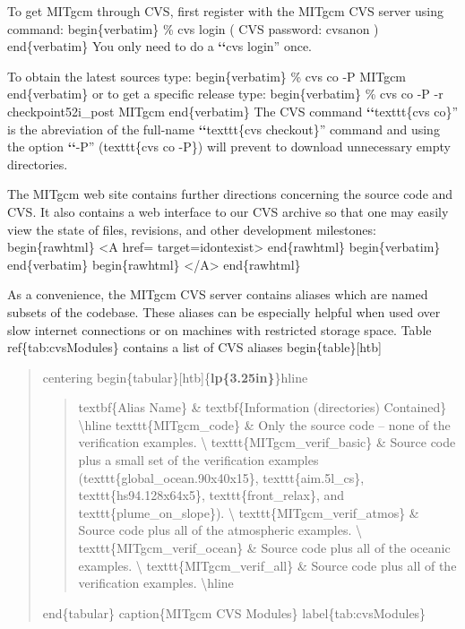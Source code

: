 \documentclass[letterpaper,10pt,english]{sphinxmanual}
\begin{document}
To get MITgcm through CVS, first register with the MITgcm CVS server
using command:
begin\{verbatim\}
\% cvs login ( CVS password: cvsanon )
end\{verbatim\}
You only need to do a {\color{red}\bfseries{}{}`{}`}cvs login'' once.

To obtain the latest sources type:
begin\{verbatim\}
\% cvs co -P MITgcm
end\{verbatim\}
or to get a specific release type:
begin\{verbatim\}
\% cvs co -P -r checkpoint52i\_post MITgcm
end\{verbatim\}
The CVS command {\color{red}\bfseries{}{}`{}`}texttt\{cvs co\}'' is the abreviation of the full-name
{\color{red}\bfseries{}{}`{}`}texttt\{cvs checkout\}'' command and using the option {\color{red}\bfseries{}{}`{}`}-P'' (texttt\{cvs co -P\})
will prevent to download unnecessary empty directories.

The MITgcm web site contains further directions concerning the source
code and CVS.  It also contains a web interface to our CVS archive so
that one may easily view the state of files, revisions, and other
development milestones:
begin\{rawhtml\} \textless{}A href=\sphinxquotedblright{}\sphinxquotedblright{} target=\sphinxquotedblright{}idontexist\sphinxquotedblright{}\textgreater{} end\{rawhtml\}
begin\{verbatim\}
end\{verbatim\}
begin\{rawhtml\} \textless{}/A\textgreater{} end\{rawhtml\}

As a convenience, the MITgcm CVS server contains aliases which are
named subsets of the codebase.  These aliases can be especially
helpful when used over slow internet connections or on machines with
restricted storage space.  Table ref\{tab:cvsModules\} contains a list
of CVS aliases
begin\{table\}{[}htb{]}
\begin{quote}

centering
begin\{tabular\}{[}htb{]}\{{\color{red}\bfseries{}\textbar{}lp\{3.25in\}\textbar{}}\}hline
\begin{quote}

textbf\{Alias Name\}    \&  textbf\{Information (directories) Contained\}  \textbackslash{}hline
texttt\{MITgcm\_code\}  \&  Only the source code -- none of the verification examples.  \textbackslash{}
texttt\{MITgcm\_verif\_basic\}
\&  Source code plus a small set of the verification examples
(texttt\{global\_ocean.90x40x15\}, texttt\{aim.5l\_cs\}, texttt\{hs94.128x64x5\},
texttt\{front\_relax\}, and texttt\{plume\_on\_slope\}).  \textbackslash{}
texttt\{MITgcm\_verif\_atmos\}  \&  Source code plus all of the atmospheric examples.  \textbackslash{}
texttt\{MITgcm\_verif\_ocean\}  \&  Source code plus all of the oceanic examples.  \textbackslash{}
texttt\{MITgcm\_verif\_all\}    \&  Source code plus all of the
verification examples. \textbackslash{}hline
\end{quote}

end\{tabular\}
caption\{MITgcm CVS Modules\}
label\{tab:cvsModules\}
\end{quote}
\end{document}
